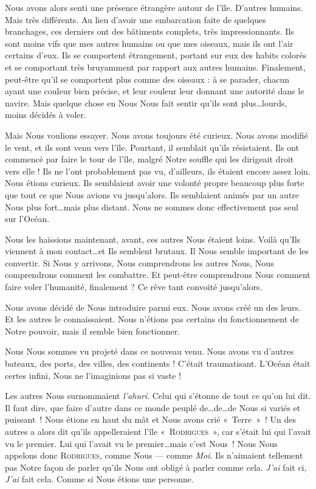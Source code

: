 {        Nous avons alors senti une présence étrangère autour de l’île.
        D’autres humains.  Mais très différents.
        Au lieu d’avoir une embarcation faite de quelques branchages, ces derniers ont des bâtiments complets, très impressionnants.
        Ils sont moins vifs que mes autres humains ou que mes oiseaux, mais ils ont l’air certains d’eux.
        Ils se comportent étrangement, portant sur eux des habits colorés et se comportant très bruyamment par rapport aux autres humains.
        Finalement, peut-être qu’il se comportent plus comme des oiseaux :  à se parader, chacun ayant une couleur bien précise, et leur couleur leur donnant une autorité dans le navire.
        Mais quelque chose en Nous Nous fait sentir qu’ils sont plus\ldots lourds, moins décidés à voler.

        Mais Nous voulions essayer.  Nous avons toujours été curieux.
        Nous avons modifié le vent, et ils sont venu vers l’île.  Pourtant, il semblait qu’ils résistaient.
        Ils ont commencé par faire le tour de l’île, malgré Notre souffle qui les dirigeait droit vers elle !
        Ils ne l’ont probablement pas vu, d’ailleurs, ils étaient encore assez loin.
        Nous étions curieux.  Ils semblaient avoir une volonté propre beaucoup plus forte que tout ce que Nous avions vu jusqu’alors.
        Ils semblaient animés par un autre Nous plus fort\ldots mais plus distant.
        Nous ne sommes donc effectivement pas seul sur l’Océan.

        Nous les haïssions maintenant, avant, ces autres Nous étaient loins.  Voilà qu’Ils viennent à mon contact\ldots et Ils semblent brutaux.
        Il Nous semble important de les convertir.  Si Nous y arrivons, Nous comprendrons les autres Nous, Nous comprendrons comment les combattre.
        Et peut-être comprendrons Nous comment faire voler l’humanité, finalement ?  Ce rêve tant convoité jusqu’alors.

        Nous avons décidé de Nous introduire parmi eux.
        Nous avons créé un des leurs.  Et les autres le connaissaient.
        Nous n’étions pas certains du fonctionnement de Notre pouvoir, mais il semble bien fonctionner.

        Nous Nous sommes vu projeté dans ce nouveau venu.
        Nous avons vu d’autres bateaux, des ports, des villes, des continents !  C’était traumatisant.
        L’Océan était certes infini, Nous ne l’imaginions pas si vaste !

        Les autres Nous surnommaient \textit{l’ahuri}.  Celui qui s’étonne de tout ce qu’on lui dit.
        Il faut dire, que faire d’autre dans ce monde peuplé de\ldots de\ldots de Nous si variés et puissant~!
        Nous étions en haut du mât et Nous avons crié «~Terre~»~!
        Un des autres a alors dit qu’ils appelleraient l’île «~\textsc{Rodrigues}~», car s’était lui qui l’avait vu le premier.
        Lui qui l’avait vu le premier\ldots mais c’est Nous~!  Nous Nous appelons donc \textsc{Rodrigues}, comme Nous — comme \emph{Moi}.
        Ils n’aimaient tellement pas Notre façon de parler qu’ils Nous ont obligé à parler comme cela.
        \emph{J’ai} fait ci, \emph{J’ai} fait cela.  Comme si Nous étions une personne.

}
